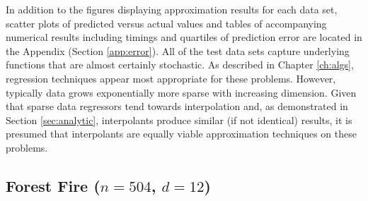 In addition to the figures displaying approximation results for each
data set, scatter plots of predicted versus actual values
  and tables of accompanying numerical results including
  timings and quartiles of prediction error are located in the
Appendix (Section \ref{app:error}). All of the test data sets
capture underlying functions that are almost certainly stochastic. As
described in Chapter \ref{ch:algs}, regression techniques
appear most appropriate for these problems. However, typically data
grows exponentially more sparse with increasing dimension. Given that
sparse data regressors tend towards interpolation and, as demonstrated
in Section \ref{sec:analytic}, interpolants produce similar (if not
identical) results, it is presumed that interpolants are equally
viable approximation techniques on these problems.

\subsection{Forest Fire ($n = 504$, $d = 12$)}

